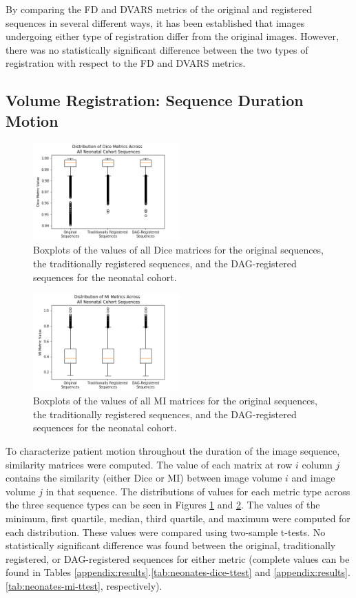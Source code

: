 By comparing the FD and DVARS metrics of the original and registered sequences in several different ways, it has been established that images undergoing either type of registration differ from the original images. However, there was no statistically significant difference between the two types of registration with respect to the FD and DVARS metrics.

\subsection{Volume Registration: Sequence Duration Motion}

\begin{figure}
\centering
\includegraphics[width=0.5\textwidth]{6/figures/neonates-dice-box.png}
\caption{Boxplots of the values of all Dice matrices for the original sequences, the traditionally registered sequences, and the DAG-registered sequences for the neonatal cohort.}
\label{fig:neonates-dice-box}
\end{figure}

\begin{figure}
\centering
\includegraphics[width=0.5\textwidth]{6/figures/neonates-mi-box.png}
\caption{Boxplots of the values of all MI matrices for the original sequences, the traditionally registered sequences, and the DAG-registered sequences for the neonatal cohort.}
\label{fig:neonates-mi-box}
\end{figure}

To characterize patient motion throughout the duration of the image sequence, similarity matrices were computed. The value of each matrix at row $i$ column $j$ contains the similarity (either Dice or MI) between image volume $i$ and image volume $j$ in that sequence. The distributions of values for each metric type across the three sequence types can be seen in Figures \ref{fig:neonates-dice-box} and \ref{fig:neonates-mi-box}. The values of the minimum, first quartile, median, third quartile, and maximum were computed for each distribution. These values were compared using two-sample t-tests. No statistically significant difference was found between the original, traditionally registered, or DAG-registered sequences for either metric (complete values can be found in Tables \ref{appendix:results}.\ref{tab:neonates-dice-ttest} and \ref{appendix:results}.\ref{tab:neonates-mi-ttest}, respectively).


